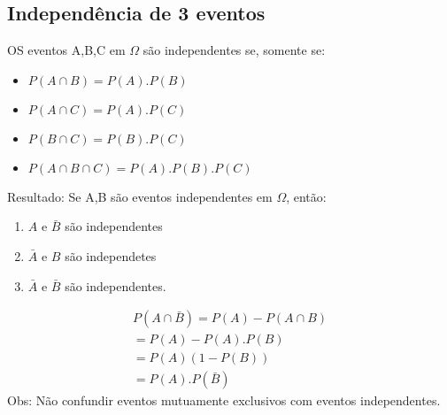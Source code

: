 \documentclass[11pt,a4paper]{book}
\begin{document}
\begin{enumerate}[label=(\alph*)]
\begin{enumerate}
\section{Independência de 3 eventos}
OS eventos A,B,C em $\Omega$ são independentes se, somente se:
\begin{itemize}
  \item $P(A \cap B) = P(A).P(B)$
  \item $P(A \cap C) = P(A).P(C)$
  \item $P(B \cap C)= P(B).P(C)$
  \item $P(A \cap B \cap C)= P(A).P(B).P(C)$
\end{itemize}
Resultado: Se A,B são eventos independentes em $\Omega$, então:
\begin{enumerate}
  \item $A$ e $\bar{B}$ são independentes
  \item $\bar{A}$ e $B$ são independetes
  \item $\bar{A}$ e $\bar{B}$ são independentes.
\end{enumerate}
\begin{figure}
  \label{fig:3}
\end{figure}

\begin{align}
  P(A \cap \bar{B})= P(A) - P(A \cap B)\\
  = P(A)-P(A).P(B)\\
  = P(A)(1-P(B))\\
  =P(A).P(\bar{B})
\end{align}
Obs: Não confundir eventos mutuamente exclusivos com eventos independentes.


\end{enumerate}
\end{enumerate}
\end{document}
